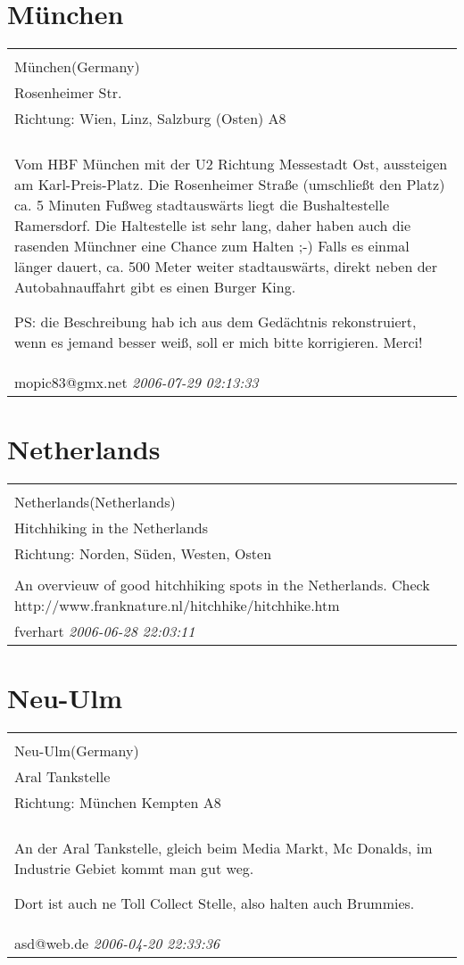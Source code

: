 \documentclass[a4paper,12pt]{article}
\begin{document}
\section{München}
\begin{tabular}{|p{13cm}|}
\hline\\
München(Germany)\\
Rosenheimer Str.\\
Richtung: Wien, Linz, Salzburg (Osten) A8 \\
\hline\\
Vom HBF München mit der U2 Richtung Messestadt Ost, aussteigen am Karl-Preis-Platz.
Die Rosenheimer Straße (umschließt den Platz) ca. 5 Minuten Fußweg stadtauswärts liegt die Bushaltestelle Ramersdorf. Die Haltestelle ist sehr lang, daher haben auch die rasenden Münchner eine Chance zum Halten ;-)
Falls es einmal länger dauert, ca. 500 Meter weiter stadtauswärts, direkt neben der Autobahnauffahrt gibt es einen Burger King.

PS: die Beschreibung hab ich aus dem Gedächtnis rekonstruiert, wenn es jemand besser weiß, soll er mich bitte korrigieren. Merci! \\
mopic83@gmx.net \textit{ 2006-07-29 02:13:33 }\\\hline
\end{tabular}


\section{Netherlands}
\begin{tabular}{|p{13cm}|}
\hline\\
Netherlands(Netherlands)\\
Hitchhiking in the Netherlands\\
Richtung: Norden, Süden, Westen, Osten \\
\hline\\
An overvieuw of good hitchhiking spots in the Netherlands. Check http://www.franknature.nl/hitchhike/hitchhike.htm \\
fverhart \textit{ 2006-06-28 22:03:11 }\\\hline
\end{tabular}


\section{Neu-Ulm}
\begin{tabular}{|p{13cm}|}
\hline\\
Neu-Ulm(Germany)\\
Aral Tankstelle\\
Richtung: München Kempten A8 \\
\hline\\
An der Aral Tankstelle, gleich beim Media Markt, Mc Donalds, im Industrie Gebiet kommt man gut weg.

Dort ist auch ne Toll Collect Stelle, also halten auch Brummies. \\
asd@web.de \textit{ 2006-04-20 22:33:36 }\\\hline
\end{tabular}
\end{document}
